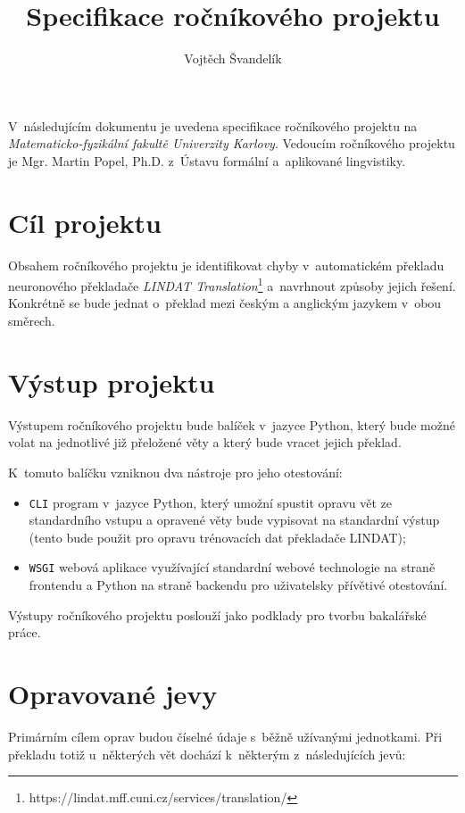 \documentclass[12pt,a4paper]{article}
\title{Specifikace ročníkového projektu}
\author{Vojtěch Švandelík}
\begin{document}
	\maketitle
	
	V~následujícím dokumentu je uvedena specifikace ročníkového projektu na \textit{Matematicko-fyzikální fakultě Univerzity Karlovy}. Vedoucím ročníkového projektu je Mgr. Martin Popel, Ph.D. z~Ústavu formální a~aplikované lingvistiky.
	
	\section{Cíl projektu}
	Obsahem ročníkového projektu je identifikovat chyby v~automatickém překladu neuronového překladače \textit{LINDAT Translation}\footnote{https://lindat.mff.cuni.cz/services/translation/} a~navrhnout způsoby jejich řešení. Konkrétně se bude jednat o~překlad mezi českým a anglickým jazykem v~obou směrech.
		
	\section{Výstup projektu}
	Výstupem ročníkového projektu bude balíček v~jazyce Python, který bude možné volat na jednotlivé již přeložené věty a který bude vracet jejich  překlad.
	
	K~tomuto balíčku vzniknou dva nástroje pro jeho otestování:
	
	\begin{itemize}
		\item \verb|CLI| program v~jazyce Python, který umožní spustit opravu vět ze standardního vstupu a opravené věty bude vypisovat na standardní výstup (tento bude použit pro opravu trénovacích dat překladače LINDAT);
		\item \verb|WSGI| webová aplikace využívající standardní webové technologie na straně frontendu a Python na straně backendu pro uživatelsky přívětivé otestování.
	\end{itemize}
	
	Výstupy ročníkového projektu poslouží jako podklady pro tvorbu bakalářské práce.
	
	\section{Opravované jevy}
	Primárním cílem oprav budou číselné údaje s~běžně užívanými jednotkami. Při překladu totiž u~některých vět dochází k~některým z~následujících jevů:
	
\end{document}
